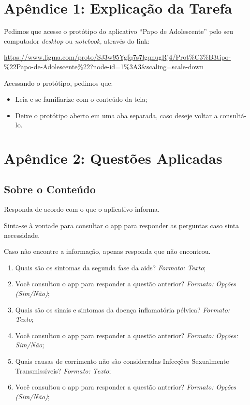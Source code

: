 \documentclass[12pt]{article}
\begin{document}
\section{Apêndice 1: Explicação da Tarefa}
\label{ap:explicacao}

Pedimos que acesse o protótipo do aplicativo ``Papo de Adolescente'' pelo seu computador \textit{desktop} ou \textit{notebook}, através do link:

\url{https://www.figma.com/proto/SJ3w95Ygfq7s7lgqnugRj4/Prot%C3%B3tipo-%22Papo-de-Adolescente%22?node-id=1%3A3&scaling=scale-down}

Acessando o protótipo, pedimos que:

\begin{itemize}
	\item Leia e se familiarize com o conteúdo da tela;
	\item Deixe o protótipo aberto em uma aba separada, caso deseje voltar a consultá-lo.
\end{itemize}

\section{Apêndice 2: Questões Aplicadas}
\label{ap:questoes}

\subsection{Sobre o Conteúdo}

Responda de acordo com o que o aplicativo informa. 

Sinta-se à vontade para consultar o app para responder as perguntas caso sinta necessidade. 

Caso não encontre a informação, apenas responda que não encontrou.

\begin{enumerate}
	\item Quais são os sintomas da segunda fase da aids? \textit{Formato: Texto};
	\item Você consultou o app para responder a questão anterior? \textit{Formato: Opções (Sim/Não)};
	\item Quais são os sinais e sintomas da doença inflamatória pélvica? \textit{Formato: Texto};
	\item Você consultou o app para responder a questão anterior? \textit{Formato: Opções: Sim/Não};
	\item Quais causas de corrimento não são consideradas Infecções Sexualmente Transmissíveis? \textit{Formato: Texto};
	\item Você consultou o app para responder a questão anterior? \textit{Formato: Opções (Sim/Não)};
\end{enumerate}
\end{document}
